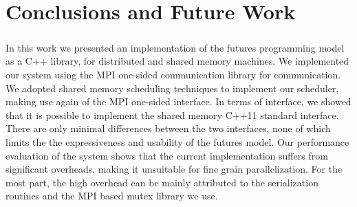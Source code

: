 \chapter{Conclusions and Future Work}
\label{chap:conclusion}
\paragraph{}
In this work we presented an implementation of the futures programming model as a C++ library,
for distributed and shared memory machines.  We implemented our system using the MPI one-sided communication
library for communication. We adopted shared memory scheduling techniques to implement 
our scheduler, making use again of the MPI one-sided interface.  In terms of interface, we showed that it 
is possible to implement the shared memory C++11 standard interface.  There are only minimal differences
between the two interfaces, none of which limits the the expressiveness and usability of the futures model. 
Our performance evaluation of the system shows
that the current implementation suffers from significant overheads, making it unsuitable for fine grain
parallelization.  For the most part, the high overhead can be mainly attributed to the serialization 
routines and the MPI based mutex library we use.  

